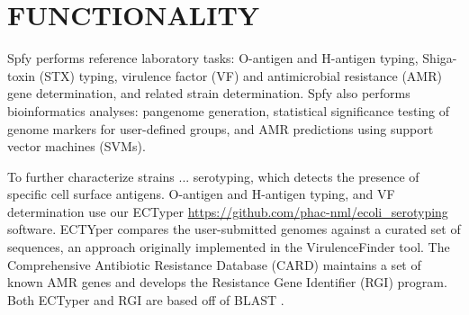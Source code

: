 \documentclass[a4,center,fleqn]{NAR}
\begin{document}

\enlargethispage{-65.1pt}



\section{FUNCTIONALITY}
Spfy performs reference laboratory tasks: O-antigen and H-antigen typing, Shiga-toxin (STX) typing,  virulence factor (VF) and antimicrobial resistance (AMR) gene determination, and related strain determination.
Spfy also performs bioinformatics analyses: pangenome generation, statistical significance testing of genome markers for user-defined groups, and AMR predictions using support vector machines (SVMs).

To further characterize strains ... serotyping, which detects the presence of specific cell surface antigens.
O-antigen and H-antigen typing, and VF determination use our ECTyper \url{https://github.com/phac-nml/ecoli_serotyping} software.
ECTYper compares the user-submitted genomes against a curated set of sequences, an approach originally implemented in the VirulenceFinder \cite{joensen2014real} tool.
The Comprehensive Antibiotic Resistance Database (CARD) \cite{mcarthur2013comprehensive} maintains a set of known AMR genes and develops the Resistance Gene Identifier (RGI) program.
Both ECTyper and RGI are based off of BLAST \cite{pmid2231712}.
\end{document}
